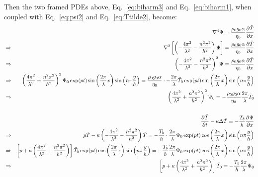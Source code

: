 Then the two framed PDEs above, Eq.~\eqref{eq:biharm3} and Eq.~\eqref{eq:biharm1},
when coupled with Eq.~\eqref{eq:psi2} and  Eq.~\eqref{eq:Ttilde2}, become:
\begin{eqnarray}
&& \nabla^4 \Psi= \frac{\rho_0 g_0 \alpha}{\eta_0} \frac{\partial \tilde{T}}{\partial x} \nonumber \\
&\Rightarrow& \nabla^2  \left[\left( -\frac{4\pi^2}{\lambda^2} - \frac{n^2\pi^2}{h^2} \right) \Psi \right] 
= \frac{\rho_0 g_0 \alpha}{\eta_0} \frac{\partial \tilde{T}}{\partial x} \nonumber\\
&\Rightarrow& \left( -\frac{4\pi^2}{\lambda^2} - \frac{n^2\pi^2}{h^2} \right)^2 \Psi 
= \frac{\rho_0 g_0 \alpha}{\eta_0} \frac{\partial \tilde{T}}{\partial x} 
\nonumber\\
&\Rightarrow& \left( \frac{4\pi^2}{\lambda^2} + \frac{n^2\pi^2}{h^2} \right)^2
\Psi_0 \exp(pt) 
\sin \left(\frac{2\pi}{\lambda} x \right) 
\sin \left(n\pi \frac{y}{h} \right)
=
\frac{\rho_0 g_0 \alpha}{\eta_0} \cdot - \frac{2 \pi }{\lambda}
\tilde{T}_0 \exp(pt) 
\sin \left( \frac{2\pi}{\lambda} x \right) 
\sin \left(n\pi \frac{y}{h} \right) 
\nonumber\\
&\Rightarrow& 
\left( \frac{4\pi^2}{\lambda^2} + \frac{n^2\pi^2}{h^2} \right)^2
\Psi_0 
=
-\frac{\rho_0 g_0 \alpha}{\eta_0}  \frac{2 \pi }{\lambda}
\tilde{T}_0 
\\
\nonumber\\
&& \frac{\partial \tilde{T}}{\partial t} - \kappa \Delta \tilde{T} 
= -  \frac{T_b}{h}   \frac{\partial \Psi}{\partial x} \nonumber\\
&\Rightarrow & p \tilde{T} - \kappa \left(-\frac{4\pi^2}{\lambda^2} - \frac{n^2\pi^2}{h^2}\right) \tilde{T}   
= -  \frac{T_b}{h}   \cdot  \frac{2 \pi}{\lambda} \Psi_0 \exp(pt)  
\cos \left(\frac{2\pi}{\lambda} x \right) 
\sin \left(n\pi \frac{y}{h} \right) \nonumber\\
&\Rightarrow & 
\left[ p  + \kappa \left(\frac{4\pi^2}{\lambda^2} + \frac{n^2\pi^2}{h^2}\right) \right]
\tilde{T}_0 \exp(pt) 
\cos \left( \frac{2\pi}{\lambda} x \right) 
\sin \left(n\pi \frac{y}{h} \right)
= -  \frac{T_b}{h}   \frac{2 \pi}{\lambda} \Psi_0 \exp(pt)  
\cos \left(\frac{2\pi}{\lambda} x \right) 
\sin \left(n\pi \frac{y}{h} \right) \nonumber\\
&\Rightarrow & 
\left[ p  + \kappa \left(\frac{4\pi^2}{\lambda^2} + \frac{n^2\pi^2}{h^2}\right) \right]
\tilde{T}_0 
= -  \frac{T_b}{h}   \frac{2 \pi}{\lambda} \Psi_0 
\end{eqnarray}
